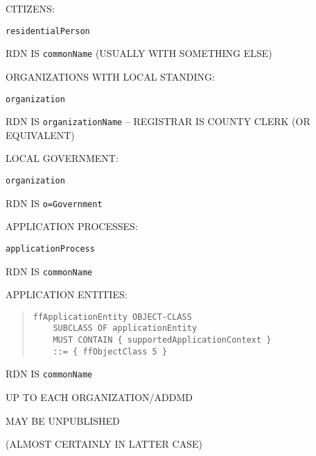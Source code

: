 \begin{bwslide}

\begin{nrtc}
\item	CITIZENS:
    \begin{nrtc}
    \item	\verb"residentialPerson"
    \end{nrtc}
RDN IS \verb"commonName" (USUALLY WITH SOMETHING ELSE)

\item	ORGANIZATIONS WITH LOCAL STANDING:
    \begin{nrtc}
    \item	\verb"organization"
    \end{nrtc}
RDN IS \verb"organizationName" -- REGISTRAR IS COUNTY CLERK (OR EQUIVALENT)

\item	LOCAL GOVERNMENT:
    \begin{nrtc}
    \item	\verb"organization"
    \end{nrtc}
RDN IS \verb"o=Government"
\end{nrtc}
\end{bwslide}


\begin{bwslide}

\begin{nrtc}
\item	APPLICATION PROCESSES:
    \begin{nrtc}
    \item	\verb"applicationProcess"
    \end{nrtc}
RDN IS \verb"commonName"

\item	APPLICATION ENTITIES:
\begin{quote}\begin{verbatim}
ffApplicationEntity OBJECT-CLASS
    SUBCLASS OF applicationEntity
    MUST CONTAIN { supportedApplicationContext }
    ::= { ffObjectClass 5 }
\end{verbatim}\end{quote}
RDN IS \verb"commonName"
\end{nrtc}
\end{bwslide}


\begin{bwslide}

\begin{nrtc}
\item	UP TO EACH ORGANIZATION/ADDMD

\item	MAY BE UNPUBLISHED
    \begin{nrtc}
    \item	(ALMOST CERTAINLY IN LATTER CASE)
    \end{nrtc}
\end{nrtc}
\end{bwslide}


